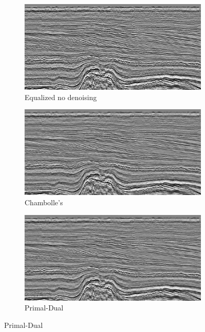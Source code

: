 \documentclass[11pt]{article}
\begin{document}
\begin{figure}
\centering
\graphicspath{{images/}}
\begin{subfigure}[b]{0.5\textwidth}
\centering
\includegraphics[width=\textwidth]{slice_eq}
\caption{Equalized no denoising}
\label{slice:noise}
\end{subfigure}
\begin{subfigure}[b]{0.5\textwidth}
\centering
\includegraphics[width=\textwidth]{slice_eq_ch}
\caption{Chambolle's}
\label{slice:ch}
\end{subfigure}
\begin{subfigure}[b]{0.5\textwidth}
\centering
\includegraphics[width=\textwidth]{slice_eq_pd}
\caption{Primal-Dual}

\end{subfigure}
\end{figure}
\end{document}
